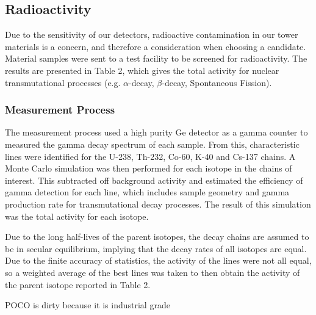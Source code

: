 \documentclass{report}
\begin{document}
\subsection{Radioactivity}

Due to the sensitivity of our detectors, radioactive contamination in our tower
materials is a concern, and therefore a consideration when choosing a candidate.
Material samples were sent to a test facility to be screened for radioactivity.
The results are presented in Table 2, which gives the total activity for nuclear
transmutational processes (e.g. $\alpha$-decay, $\beta$-decay, Spontaneous Fission).

\subsubsection{Measurement Process}
The measurement process used a high purity Ge detector as a gamma counter to measured the
gamma decay spectrum of each sample. From this, characteristic lines were identified for
the U-238, Th-232, Co-60, K-40 and Cs-137 chains. A Monte Carlo simulation was then
performed for each isotope in the chains of interest. This subtracted off background
activity and estimated the efficiency of gamma detection for each line, which includes
sample geometry and gamma production rate for transmutational decay processes. The result
of this simulation was the total activity for each isotope.

Due to the long half-lives of the parent isotopes, the decay chains are assumed to be in
secular equilibrium, implying that the decay rates of all isotopes are equal. Due to the
finite accuracy of statistics, the activity of the lines were not all equal, so a weighted
average of the best lines was taken to then obtain the activity of the parent isotope
reported in Table 2.


POCO is dirty because it is industrial grade
\end{document}
